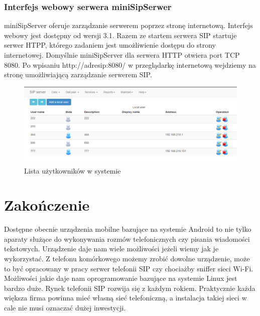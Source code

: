 \subsection{Interfejs webowy serwera miniSipSerwer}

miniSipServer oferuje zarządzanie serwerem poprzez stronę internetową. Interfejs webowy jest dostępny od wersji 3.1. Razem ze startem serwera SIP startuje serwer HTPP, którego zadaniem jest umożliwienie dostępu do strony internetowej. Domyślnie miniSipServer dla serwera HTTP otwiera port TCP 8080. Po wpisaniu http://adresip:8080/ w przeglądarkę internetową wejdziemy na stronę umożliwiającą zarządzanie serwerem SIP.




\begin{figure}[H]
\centering
\includegraphics[width=1.1\linewidth]{sipweb}
\caption{Lista użytkowników w systemie}
\label{fig:sipweb}
\end{figure}




\clearpage
\afterpage{\null\newpage}
 

\chapter*{Zakończenie}
Dostępne obecnie urządzenia mobilne bazujące na systemie Android to nie tylko aparaty służące do wykonywania rozmów telefonicznych czy pisania wiadomości tekstowych. Urządzenie daje nam wiele możliwości jeżeli wiemy jak je wykorzystać. Z telefonu komórkowego możemy zrobić dowolne urządzenie, może to być opracowany w pracy serwer telefonii SIP czy chociażby sniffer sieci Wi-Fi. Możliwości jakie daje nam oprogramowanie bazujące na systemie Linux jest bardzo duże. Rynek telefonii SIP rozwija się z każdym rokiem. Praktycznie każda większa firma powinna mieć własną sieć telefoniczną, a instalacja takiej sieci w cale nie musi oznaczać dużej inwestycji. 
\afterpage{\null\newpage}

\clearpage
\afterpage{\null\newpage}
 
